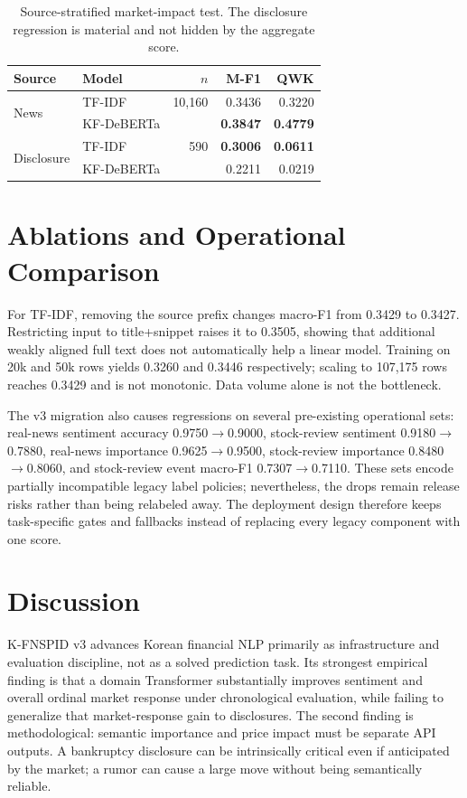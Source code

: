 \documentclass[11pt]{article}
\newcommand{\dataset}{K-FNSPID v3}
\begin{document}
\begin{table}[t]
\centering
\scriptsize
\begin{tabular}{@{}llrrr@{}}
\toprule
Source & Model & $n$ & M-F1 & QWK \\
\midrule
\multirow{2}{*}{News} & TF-IDF & 10,160 & 0.3436 & 0.3220 \\
 & KF-DeBERTa & & \textbf{0.3847} & \textbf{0.4779} \\
\multirow{2}{*}{Disclosure} & TF-IDF & 590 & \textbf{0.3006} & \textbf{0.0611} \\
 & KF-DeBERTa & & 0.2211 & 0.0219 \\
\bottomrule
\end{tabular}
\caption{Source-stratified market-impact test. The disclosure regression is material and not hidden by the aggregate score.}
\label{tab:source}
\end{table}

\section{Ablations and Operational Comparison}

For TF-IDF, removing the source prefix changes macro-F1 from 0.3429 to 0.3427. Restricting input to title+snippet raises it to 0.3505, showing that additional weakly aligned full text does not automatically help a linear model. Training on 20k and 50k rows yields 0.3260 and 0.3446 respectively; scaling to 107,175 rows reaches 0.3429 and is not monotonic. Data volume alone is not the bottleneck.

The v3 migration also causes regressions on several pre-existing operational sets: real-news sentiment accuracy 0.9750$\rightarrow$0.9000, stock-review sentiment 0.9180$\rightarrow$0.7880, real-news importance 0.9625$\rightarrow$0.9500, stock-review importance 0.8480$\rightarrow$0.8060, and stock-review event macro-F1 0.7307$\rightarrow$0.7110. These sets encode partially incompatible legacy label policies; nevertheless, the drops remain release risks rather than being relabeled away. The deployment design therefore keeps task-specific gates and fallbacks instead of replacing every legacy component with one score.

\section{Discussion}

\dataset{} advances Korean financial NLP primarily as infrastructure and evaluation discipline, not as a solved prediction task. Its strongest empirical finding is that a domain Transformer substantially improves sentiment and overall ordinal market response under chronological evaluation, while failing to generalize that market-response gain to disclosures. The second finding is methodological: semantic importance and price impact must be separate API outputs. A bankruptcy disclosure can be intrinsically critical even if anticipated by the market; a rumor can cause a large move without being semantically reliable.
\end{document}
